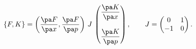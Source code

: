 \begin{equation}
\{F,K\} =\left(\frac{\pa F}{\pa x},\frac{\pa F}{\pa p}\right)
\, J\, \left(\begin{matrix}  \dfrac{\pa K}{\pa x}\\ \\
\dfrac{\pa K}{\pa p}\end{matrix}\right), \qquad
J=\left(\begin{matrix} 0&1\\-1&0\end{matrix}\right).
\label{pbcoord}
\end{equation}

